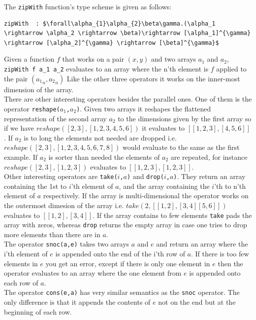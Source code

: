 \documentclass[11pt]{article}
\begin{document}
The {\tt zipWith} function's type scheme is given as follows: 
\begin{lstlisting}[numbers=none,frame=none]
zipWith  : $\forall\alpha_{1}\alpha_{2}\beta\gamma.(\alpha_1 \rightarrow \alpha_2 \rightarrow \beta)\rightarrow [\alpha_1]^{\gamma} \rightarrow [\alpha_2]^{\gamma} \rightarrow [\beta]^{\gamma}$
\end{lstlisting}
Given a function $f$ that works on a pair $(x,y)$ and two arrays $a_1$ and $a_2$, {\tt zipWith f a\_1 a\_2}  evaluates to an array where the n'th element is $f$ applied to the pair $({a_{1}}_n,{a_{2}}_n)$ 
Like the other three operators it works on the inner-most dimension of the array\cite{ElsmanDybdal:Array:2014}.\\

There are other interesting operators besides the parallel ones. One of them is the operator {\tt reshape($a_1$,$a_2$)}.
Given two arrays it reshapes the flattened representation of the second array $a_2$ to the dimensions given by the first array so 
if we have $reshape([2,3],[1,2,3,4,5,6])$ it evaluates to $[[1,2,3],[4,5,6]]$.
If $a_2$ is to long the elements not needed are dropped i.e. $reshape([2,3],[1,2,3,4,5,6,7,8])$ would evaluate to the same as the first example.
If $a_2$ is sorter than needed the elements of $a_2$ are repeated, for instance $reshape([2,3],[1,2,3])$ evaluates to $[[1,2,3],[1,2,3]]$.\\

Other interesting operators are {\tt take($i$,$a$)} and {\tt drop($i$,$a$)}.
They return an array containing the 1st to $i$'th element of $a$,
and the array containing the $i$'th to n'th element of $a$ respectively.
If the array is multi-dimensional the operator works on the outermost dimesion of the array i.e.
$take(2,[[1,2],[3,4][5,6]])$ evaluates to $[[1,2],[3,4]]$.
If the array contains to few elements {\tt take} pads the array with zeros,
whereas {\tt drop} returns the empty array in case one tries to drop more elements than there are in $a$. \\

The operator {\tt snoc(a,e)} takes two arrays $a$ and $e$ and return an array where the i'th element of $e$ is appended onto the end of the i'th row of $a$.
If there is too few elements in $e$ you get an error,
except if there is only one element in $e$ then the operator evaluates to an array where the one element from $e$
is appended onto each row of $a$.\\

The operator {\tt cons(e,a)} has very similar semantics as the {\tt snoc} operator.
The only difference is that it appends the contents of $e$ not on the end but at the beginning of each row.\\
\end{document}
